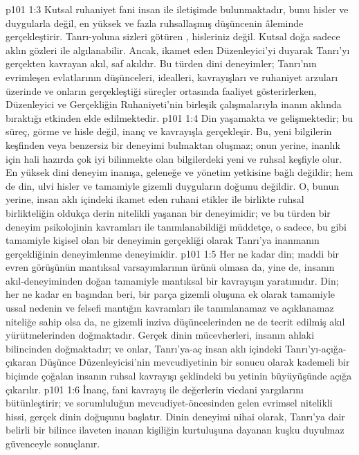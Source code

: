 \vs p101 1:3 Kutsal ruhaniyet fani insan ile iletişimde bulunmaktadır, bunu hisler ve duygularla değil, en yüksek ve fazla ruhsallaşmış düşüncenin âleminde gerçekleştirir. Tanrı\hyp{}yoluna sizleri götüren , hisleriniz değil. Kutsal doğa sadece aklın gözleri ile algılanabilir. Ancak, ikamet eden Düzenleyici’yi duyarak Tanrı’yı gerçekten kavrayan akıl, saf akıldır. Bu türden dini deneyimler; Tanrı’nın evrimleşen evlatlarının düşünceleri, idealleri, kavrayışları ve ruhaniyet arzuları üzerinde ve onların gerçekleştiği süreçler ortasında faaliyet gösterirlerken, Düzenleyici ve Gerçekliğin Ruhaniyeti’nin birleşik çalışmalarıyla inanın aklında bıraktığı etkinden elde edilmektedir.
\vs p101 1:4 Din yaşamakta ve gelişmektedir; bu süreç, görme ve hisle değil, inanç ve kavrayışla gerçekleşir. Bu, yeni bilgilerin keşfinden veya benzersiz bir deneyimi bulmaktan oluşmaz; onun yerine, inanlık için hali hazırda çok iyi bilinmekte olan bilgilerdeki yeni ve ruhsal  keşfiyle olur. En yüksek dini deneyim inanışa, geleneğe ve yönetim yetkisine bağlı değildir; hem de din, ulvi hisler ve tamamiyle gizemli duyguların doğumu değildir. O, bunun yerine, insan aklı içindeki ikamet eden ruhani etikler ile birlikte ruhsal birlikteliğin oldukça derin nitelikli yaşanan bir deneyimidir; ve bu türden bir deneyim psikolojinin kavramları ile tanımlanabildiği müddetçe, o sadece, bu gibi tamamiyle kişisel olan bir deneyimin gerçekliği olarak Tanrı’ya inanmanın gerçekliğinin deneyimlenme deneyimidir.
\vs p101 1:5 Her ne kadar din; maddi bir evren görüşünün mantıksal varsayımlarının ürünü olmasa da, yine de, insanın akıl\hyp{}deneyiminden doğan tamamiyle mantıksal bir kavrayışın yaratımıdır. Din; her ne kadar en başından beri, bir parça gizemli oluşuna ek olarak tamamiyle ussal nedenin ve felsefi mantığın kavramları ile tanımlanamaz ve açıklanamaz niteliğe sahip olsa da, ne gizemli inziva düşüncelerinden ne de tecrit edilmiş akıl yürütmelerinden doğmaktadır. Gerçek dinin mücevherleri, insanın ahlaki bilincinden doğmaktadır; ve onlar, Tanrı’ya\hyp{}aç insan aklı içindeki Tanrı’yı\hyp{}açığa\hyp{}çıkaran Düşünce Düzenleyicisi’nin mevcudiyetinin bir sonucu olarak kademeli bir biçimde çoğalan insanın ruhsal kavrayışı şeklindeki bu yetinin büyüyüşünde açığa çıkarılır.
\vs p101 1:6 İnanç, fani kavrayış ile değerlerin vicdani yargılarını bütünleştirir; ve sorumluluğun mevcudiyet\hyp{}öncesinden gelen evrimsel nitelikli hissi, gerçek dinin doğuşunu başlatır. Dinin deneyimi nihai olarak, Tanrı’ya dair belirli bir bilince ilaveten inanan kişiliğin kurtuluşuna dayanan kuşku duyulmaz güvenceyle sonuçlanır.

